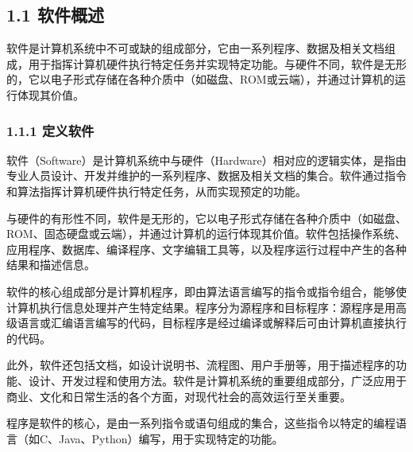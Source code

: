 
\hypertarget{ux8f6fux4ef6ux6982ux8ff0}{%
\subsection{1.1 软件概述}\label{ux8f6fux4ef6ux6982ux8ff0}}

软件是计算机系统中不可或缺的组成部分，它由一系列程序、数据及相关文档组成，用于指挥计算机硬件执行特定任务并实现特定功能。与硬件不同，软件是无形的，它以电子形式存储在各种介质中（如磁盘、ROM或云端），并通过计算机的运行体现其价值。

\hypertarget{ux5b9aux4e49ux8f6fux4ef6}{%
\subsubsection{1.1.1 定义软件}\label{ux5b9aux4e49ux8f6fux4ef6}}

软件（Software）是计算机系统中与硬件（Hardware）相对应的逻辑实体，是指由专业人员设计、开发并维护的一系列程序、数据及相关文档的集合。软件通过指令和算法指挥计算机硬件执行特定任务，从而实现预定的功能。

与硬件的有形性不同，软件是无形的，它以电子形式存储在各种介质中（如磁盘、ROM、固态硬盘或云端），并通过计算机的运行体现其价值。软件包括操作系统、应用程序、数据库、编译程序、文字编辑工具等，以及程序运行过程中产生的各种结果和描述信息。

软件的核心组成部分是计算机程序，即由算法语言编写的指令或指令组合，能够使计算机执行信息处理并产生特定结果。程序分为源程序和目标程序：源程序是用高级语言或汇编语言编写的代码，目标程序是经过编译或解释后可由计算机直接执行的代码。

此外，软件还包括文档，如设计说明书、流程图、用户手册等，用于描述程序的功能、设计、开发过程和使用方法。软件是计算机系统的重要组成部分，广泛应用于商业、文化和日常生活的各个方面，对现代社会的高效运行至关重要。



程序是软件的核心，是由一系列指令或语句组成的集合，这些指令以特定的编程语言（如C、Java、Python）编写，用于实现特定的功能。

